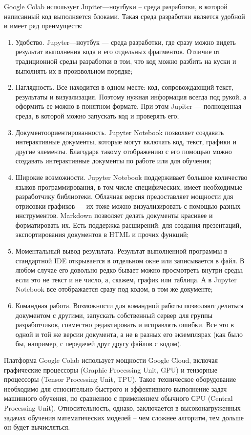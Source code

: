     Google Colab использует Jupiter—ноутбуки – среда разработки, в которой написанный код выполняется блоками. Такая среда разработки является удобной и имеет ряд преимуществ:
    \begin{enumerate}
        \item Удобство. Jupyter—ноутбук — среда разработки, где сразу можно видеть результат выполнения кода и его отдельных фрагментов. Отличие от традиционной среды разработки в том, что код можно разбить на куски и выполнять их в произвольном порядке;
        \item Наглядность. Все находится в одном месте: код, сопровождающий текст, результаты и визуализация. Поэтому нужная информация всегда под рукой, а оформить ее можно в понятном формате. При этом Jupiter — полноценная среда, в которой можно запускать код и проверять его;
        \item Документоориентированность. Jupyter Notebook позволяет создавать интерактивные документы, которые могут включать код, текст, графики и другие элементы. Благодаря такому отображению с его помощью можно создавать интерактивные документы по работе или для обучения;
        \item Широкие возможности. Jupyter Notebook поддерживает большое количество языков программирования, в том числе специфических, имеет необходимые разработчику библиотеки. Облачная версия предоставляет мощности для отрисовки графиков — их тоже можно визуализировать с помощью разных инструментов. Markdown позволяет делать документы красивее и форматировать их. Есть поддержка расширений: для создания презентаций, экспортирования документов в HTML и прочих функций;
        \item Моментальный вывод результата. Результат выполненной программы в стандартной IDE открывается в отдельном окне или записывается в файл. В любом случае его довольно редко бывает можно просмотреть внутри среды, если это не текст и не число, а, скажем, график или таблица. А в Jupyter Notebook все отображается сразу под кодом, в том же документе;
        \item Командная работа. Возможности для командной работы позволяют делиться документом с другими, запускать собственный сервер для группы разработчиков, совместно редактировать и исправлять ошибки. Все это в одной и той же версии документа, а не в разных его экземплярах (как было бы, например, с передачей друг другу файлов с кодом).
    \end{enumerate}

    Платформа Google Colab использует мощности Google Cloud, включая графические процессоры (Graphic Processing Unit, GPU) и тензорные процессоры (Tensor Processing Unit, TPU). Такое техническое оборудование необходимо для относительно быстрого и эффективного выполнение задач машинного обучения, по сравнению с применением обычного СPU (Central Processing Unit). Относительность, однако, заключается в высоконагруженных задачах обучения математических моделей – чем сложнее алгоритм, тем дольше он будет вычисляться.

